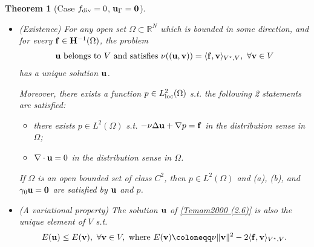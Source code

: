 \documentclass[oneside,11pt]{book}
\numberwithin{equation}{section}
\newtheorem{theorem}{Theorem}[section]
\begin{document}
\begin{theorem}[Case $f_{\rm div} = 0$, ${\bf u}_\Gamma = {\bf 0}$]
    \begin{itemize}
        \item[(i)] (Existence) For any open set $\Omega\subset\mathbb{R}^N$ which is bounded in some direction, and for every ${\bf f}\in{\bf H}^{-1}(\Omega)$, the problem
        \begin{align}
            \label{Temam2000 (2.6)}
            {\bf u} \mbox{ belongs to } V \mbox{ and satisfies } \nu(({\bf u},{\bf v})) = \langle{\bf f},{\bf v}\rangle_{V^\star,V},\ \forall{\bf v}\in V
        \end{align}
        has a unique solution ${\bf u}$.
        
        Moreover, there exists a function $p\in L_{\rm loc}^2(\Omega)$ s.t. the following 2 statements are satisfied:
        \begin{itemize}
            \item[(a)] there exists $p\in L^2(\Omega)$ s.t. $-\nu\Delta{\bf u} + \nabla p = {\bf f}$ in the distribution sense in $\Omega$;
            \item[(b)] $\nabla\cdot{\bf u} = 0$ in the distribution sense in $\Omega$.
        \end{itemize}    
        If $\Omega$ is an open bounded set of class $C^2$, then $p\in L^2(\Omega)$ and (a), (b), and $\gamma_0{\bf u} = {\bf 0}$ are satisfied by ${\bf u}$ and $p$.
        \item[(ii)] (A variational property) The solution ${\bf u}$ of \eqref{Temam2000 (2.6)} is also the unique element of $V$ s.t.
        \begin{align*}
            E({\bf u})\le E({\bf v}),\ \forall{\bf v}\in V, \mbox{ where } E({\bf v})\coloneqq\nu\|{\bf v}\|^2 - 2\langle{\bf f},{\bf v}\rangle_{V^\star,V}.
        \end{align*}
    \end{itemize}    
\end{theorem}
\end{document}
